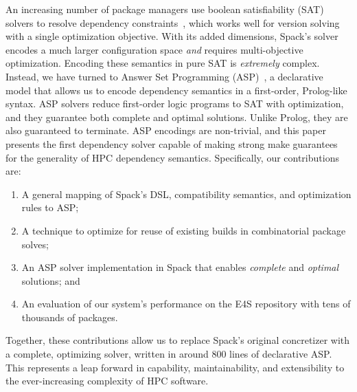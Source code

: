 An increasing number of package managers use boolean satisfiability (SAT) solvers to
resolve dependency constraints~\cite{abate2020dependency}, which works well for version
solving with a single optimization objective. With its added dimensions, Spack's solver
encodes a much larger configuration space {\it and} requires multi-objective
optimization. Encoding these semantics in pure SAT is {\it extremely} complex. Instead,
we have turned to Answer Set Programming
(ASP)~\cite{gebser+:asp-book,marek+:asp-origins}, a declarative model that allows us to
encode dependency semantics in a first-order, Prolog-like syntax. ASP solvers reduce
first-order logic programs to SAT with optimization, and they guarantee both complete
and optimal solutions. Unlike Prolog, they are also guaranteed to terminate. ASP
encodings are non-trivial, and this paper presents the first dependency solver capable
of making strong make guarantees for the generality of HPC dependency semantics.
Specifically, our contributions are:

\begin{enumerate}
\item A general mapping of Spack's DSL, compatibility semantics, and optimization rules
  to ASP;
\item A technique to optimize for reuse of existing builds in combinatorial package
  solves;
\item An ASP solver implementation in Spack that enables {\it complete} and {\it
  optimal} solutions; and
\item An evaluation of our system's performance on the E4S repository with tens of
  thousands of packages.
\end{enumerate}

Together, these contributions allow us to replace Spack's original concretizer with a
complete, optimizing solver, written in around 800 lines of declarative ASP. This
represents a leap forward in capability, maintainability, and extensibility to the
ever-increasing complexity of HPC software.
